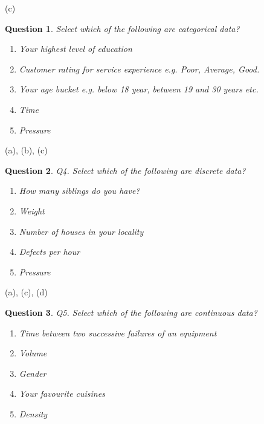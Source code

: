 \documentclass[11pt,fleqn]{book} %
\newtheorem{question}{Question}
\begin{document}
\begin{example}
\begin{rotanswer}
  (c)
\end{rotanswer}

\begin{question}
 Select which of the following are categorical data?
  \begin{enumerate}[label=(\alph*)]
    \item Your highest level of education
    \item Customer rating for service experience e.g. Poor, Average, Good.
    \item Your age bucket e.g. below 18 year, between 19 and 30 years etc.
    \item Time
    \item Pressure
\end{enumerate}
\end{question}

\begin{rotanswer}
  (a), (b), (c)
\end{rotanswer}

\begin{question}
Q4. Select which of the following are discrete data?
  \begin{enumerate}[label=(\alph*)]
    \item How many siblings do you have?
    \item Weight
    \item Number of houses in your locality
    \item Defects per hour
    \item Pressure
\end{enumerate}
\end{question}

\begin{rotanswer}
  (a), (c), (d)
\end{rotanswer}

\begin{question}
Q5. Select which of the following are continuous data?
  \begin{enumerate}[label=(\alph*)]
    \item Time between two successive failures of an equipment
    \item Volume
    \item Gender
    \item Your favourite cuisines
    \item Density
\end{enumerate}
\end{question}


\end{example}
\end{document}
